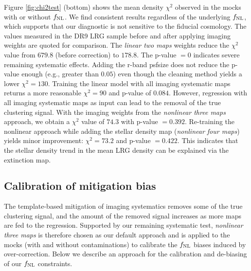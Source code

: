 Figure \ref{fig:chi2test} (bottom) shows the mean density $\chi^{2}$ observed in the mocks with or without $f_{\rm NL}$. We find consistent results regardless of the underlying $f_{\rm NL}$, which supports that our diagnostic is not sensitive to the fiducial cosmology. The values measured in the DR9 LRG sample before and after applying imaging weights are quoted for comparison. The \textit{linear two maps} weights reduce the $\chi^{2}$ value from $679.8$ (before correction) to $178.8$. The p-value $=0$ indicates severe remaining systematic effects. Adding the r-band psfsize does not reduce the p-value enough (e.g., greater than $0.05$) even though the cleaning method yields a lower $\chi^{2}=130$. Training the linear model with all imaging systematic maps returns a more reasonable $\chi^{2}=90$ and p-value of $0.084$. However, regression with all imaging systematic maps as input can lead to the removal of the true clustering signal. With the imaging weights from the \textit{nonlinear three maps} approach, we obtain a $\chi^{2}$ value of $74.3$ with p-value $=0.392$. Re-training the nonlinear approach while adding the stellar density map (\textit{nonlinear four maps}) yields minor improvement: $\chi^{2}=73.2$ and p-value $=0.422$.  This indicates that the stellar density trend in the mean LRG density can be explained via the extinction map.




\subsection{Calibration of mitigation bias}\label{ssec:calibration}

The template-based mitigation of imaging systematics removes some of the true clustering signal, and the amount of the removed signal increases as more maps are fed to the regression. Supported by our remaining systematic test, \textit{nonlinear three maps} is therefore chosen as our default approach and is applied to the mocks (with and without contaminations) to calibrate the $f_{\rm NL}$ biases induced by over-correction. Below we describe an approach for the calibration and de-biasing of our $f_{\rm NL}$ constraints. 

